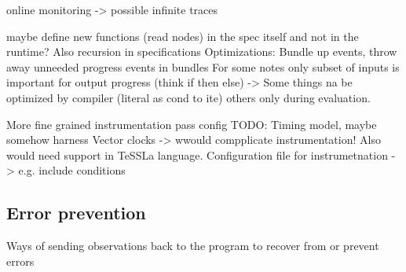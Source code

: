 online monitoring -> possible infinite traces

maybe define new functions (read nodes) in the spec itself and not in the runtime? Also recursion in specifications
Optimizations: Bundle up events, throw away unneeded progress events in  bundles
  For some notes only subset of inputs is important for output progress (think if then else)
    -> Some things na be optimized by compiler (literal as cond to ite) others only during evaluation.

More fine grained instrumentation pass config
TODO: Timing model, maybe somehow harness Vector clocks -> wwould  compplicate instrumentation! Also would need support in TeSSLa language.
Configuration file for instrumetnation -> e.g. include conditions

\subsection{Error prevention}
\label{sec:conclusion:further_work:error_prevention}
Ways of sending observations back to the program to recover from or prevent errors

